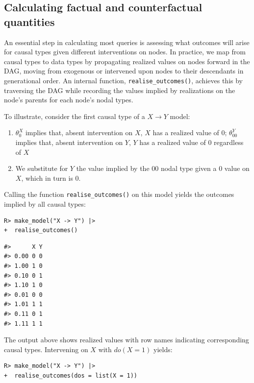 \documentclass[
  11pt,
  article]{jss}
\providecommand{\tightlist}{%
  \setlength{\itemsep}{0pt}\setlength{\parskip}{0pt}}\usepackage{longtable,booktabs,array}
\begin{document}
\subsection{Calculating factual and counterfactual
quantities}\label{sec-propagation}

An essential step in calculating most queries is assessing what outcomes
will arise for causal types given different interventions on nodes. In
practice, we map from causal types to data types by propagating realized
values on nodes forward in the DAG, moving from exogenous or intervened
upon nodes to their descendants in generational order. An internal
function, \texttt{realise\_outcomes()}, achieves this by traversing the
DAG while recording the values implied by realizations on the node's
parents for each node's nodal types.

To illustrate, consider the first causal type of a \(X \rightarrow Y\)
model:

\begin{enumerate}
\def\labelenumi{\arabic{enumi}.}
\tightlist
\item
  \(\theta^X_0\) implies that, absent intervention on \(X\), \(X\) has a
  realized value of \(0\); \(\theta^Y_{00}\) implies that, absent
  intervention on \(Y\), \(Y\) has a realized value of \(0\) regardless
  of \(X\)
\item
  We substitute for \(Y\) the value implied by the \(00\) nodal type
  given a \(0\) value on \(X\), which in turn is \(0\).
\end{enumerate}

Calling the function \texttt{realise\_outcomes()} on this model yields
the outcomes implied by all causal types:

\begin{verbatim}
R> make_model("X -> Y") |> 
+  realise_outcomes()
\end{verbatim}

\begin{verbatim}
#>      X Y
#> 0.00 0 0
#> 1.00 1 0
#> 0.10 0 1
#> 1.10 1 0
#> 0.01 0 0
#> 1.01 1 1
#> 0.11 0 1
#> 1.11 1 1
\end{verbatim}

The output above shows realized values with row names indicating
corresponding causal types. Intervening on \(X\)
\citep[see][]{pearl_causality_2009} with \(do(X=1)\) yields:

\begin{verbatim}
R> make_model("X -> Y") |> 
+  realise_outcomes(dos = list(X = 1))
\end{verbatim}
\end{document}
